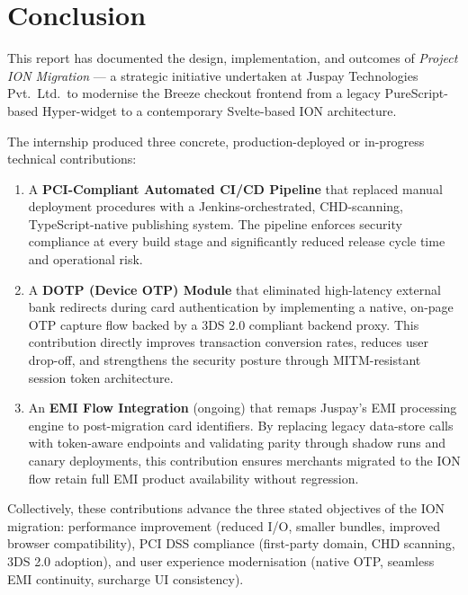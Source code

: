 \chapter{Conclusion}\label{Conclusion}

This report has documented the design, implementation, and outcomes of \textit{Project ION Migration} --- a strategic initiative undertaken at Juspay Technologies Pvt.\ Ltd.\ to modernise the Breeze checkout frontend from a legacy PureScript-based Hyper-widget to a contemporary Svelte-based ION architecture.

\par The internship produced three concrete, production-deployed or in-progress technical contributions:

\begin{enumerate}
  \item A \textbf{PCI-Compliant Automated CI/CD Pipeline} that replaced manual deployment procedures with a Jenkins-orchestrated, CHD-scanning, TypeScript-native publishing system. The pipeline enforces security compliance at every build stage and significantly reduced release cycle time and operational risk.

  \item A \textbf{DOTP (Device OTP) Module} that eliminated high-latency external bank redirects during card authentication by implementing a native, on-page OTP capture flow backed by a 3DS 2.0 compliant backend proxy. This contribution directly improves transaction conversion rates, reduces user drop-off, and strengthens the security posture through MITM-resistant session token architecture.

  \item An \textbf{EMI Flow Integration} (ongoing) that remaps Juspay's EMI processing engine to post-migration card identifiers. By replacing legacy data-store calls with token-aware endpoints and validating parity through shadow runs and canary deployments, this contribution ensures merchants migrated to the ION flow retain full EMI product availability without regression.
\end{enumerate}

\par Collectively, these contributions advance the three stated objectives of the ION migration: performance improvement (reduced I/O, smaller bundles, improved browser compatibility), PCI DSS compliance (first-party domain, CHD scanning, 3DS 2.0 adoption), and user experience modernisation (native OTP, seamless EMI continuity, surcharge UI consistency).

